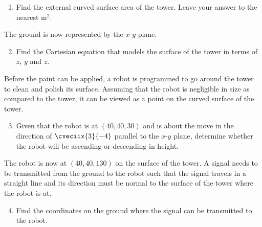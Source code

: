 \begin{problem}
    \begin{enumerate}
        \item Find the external curved surface area of the tower. Leave your answer to the nearest m$^2$.
    \end{enumerate}

    The ground is now represented by the $x$-$y$ plane.

    \begin{enumerate}
        \setcounter{enumi}{1}
        \item Find the Cartesian equation that models the surface of the tower in terms of $z$, $y$ and $z$.
    \end{enumerate}

    Before the paint can be applied, a robot is programmed to go around the tower to clean and polish its surface. Assuming that the robot is negligible in size as compared to the tower, it can be viewed as a point on the curved surface of the tower.

    \begin{enumerate}
        \setcounter{enumi}{2}
        \item Given that the robot is at $(40, 40, 30)$ and is about the move in the direction of $\cveciix{3}{-4}$ parallel to the $x$-$y$ plane, determine whether the robot will be ascending or descending in height.
    \end{enumerate}

    The robot is now at $(40, 40, 130)$ on the surface of the tower. A signal needs to be transmitted from the ground to the robot such that the signal travels in a straight line and its direction must be normal to the surface of the tower where the robot is at.

    \begin{enumerate}
        \setcounter{enumi}{3}
        \item Find the coordinates on the ground where the signal can be transmitted to the robot.
    \end{enumerate}
\end{problem}

